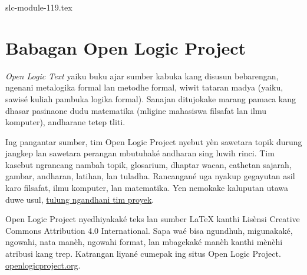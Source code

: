 \begin{filecontents*}[overwrite]{slc-module-119.tex}
\chapter*{Babagan Open Logic Project}


\textit{Open Logic Text} yaiku buku ajar sumber kabuka kang disusun
bebarengan, ngenani metalogika formal lan metodhe formal, wiwit tataran
madya (yaiku, sawisé kuliah pambuka logika formal). Sanajan ditujokake
marang pamaca kang dhasar pasinaone dudu matematika (mligine mahasiswa
filsafat lan ilmu komputer), andharane tetep tliti.

Ing pangantar sumber, tim Open Logic Project nyebut yèn sawetara
topik durung jangkep lan sawetara perangan mbutuhaké andharan
sing luwih rinci.
Tim kasebut ngrancang nambah topik, glosarium, dhaptar wacan,
cathetan sajarah, gambar, andharan, latihan, lan tuladha.
Rancangané uga nyakup gegayutan asil karo filsafat, ilmu komputer,
lan matematika.
Yen nemokake kaluputan utawa duwe usul,
\href{https://github.com/OpenLogicProject/OpenLogic/wiki/Contributing}{tulung ngandhani tim proyek}.

Open Logic Project nyedhiyakaké teks lan sumber LaTeX kanthi
Lisènsi Creative Commons Attribution 4.0 International. Sapa waé
bisa ngundhuh, migunakaké, ngowahi, nata manèh, ngowahi format,
lan mbagekaké manèh kanthi mènèhi atribusi kang trep.
Katrangan liyané cumepak ing situs Open Logic Project.
\href{http://openlogicproject.org/}{openlogicproject.org}.
\end{filecontents*}

